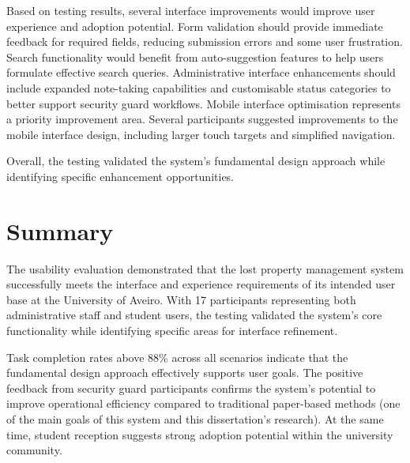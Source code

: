 Based on testing results, several interface improvements would improve user experience and adoption potential. Form validation should provide immediate feedback for required fields, reducing submission errors and some user frustration. Search functionality would benefit from auto-suggestion features to help users formulate effective search queries. Administrative interface enhancements should include expanded note-taking capabilities and customisable status categories to better support security guard workflows. Mobile interface optimisation represents a priority improvement area. Several participants suggested improvements to the mobile interface design, including larger touch targets and simplified navigation.

Overall, the testing validated the system's fundamental design approach while identifying specific enhancement opportunities.

\section{Summary} \label{section:usability_summary}

The usability evaluation demonstrated that the lost property management system successfully meets the interface and experience requirements of its intended user base at the University of Aveiro. With 17 participants representing both administrative staff and student users, the testing validated the system's core functionality while identifying specific areas for interface refinement.

Task completion rates above 88\% across all scenarios indicate that the fundamental design approach effectively supports user goals. The positive feedback from security guard participants confirms the system's potential to improve operational efficiency compared to traditional paper-based methods (one of the main goals of this system and this dissertation's research). At the same time, student reception suggests strong adoption potential within the university community.
